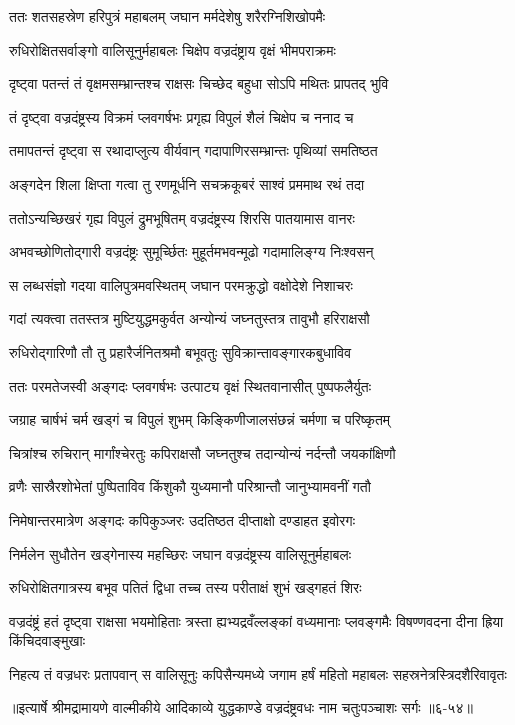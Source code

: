 \twolineshloka
{ततः शतसहस्रेण हरिपुत्रं महाबलम्}
{जघान मर्मदेशेषु शरैरग्निशिखोपमैः} %

\twolineshloka
{रुधिरोक्षितसर्वाङ्गो वालिसूनुर्महाबलः}
{चिक्षेप वज्रदंष्ट्राय वृक्षं भीमपराक्रमः} %

\twolineshloka
{दृष्ट्वा पतन्तं तं वृक्षमसम्भ्रान्तश्च राक्षसः}
{चिच्छेद बहुधा सोऽपि मथितः प्रापतद् भुवि} %

\twolineshloka
{तं दृष्ट्वा वज्रदंष्ट्रस्य विक्रमं प्लवगर्षभः}
{प्रगृह्य विपुलं शैलं चिक्षेप च ननाद च} %

\twolineshloka
{तमापतन्तं दृष्ट्वा स रथादाप्लुत्य वीर्यवान्}
{गदापाणिरसम्भ्रान्तः पृथिव्यां समतिष्ठत} %

\twolineshloka
{अङ्गदेन शिला क्षिप्ता गत्वा तु रणमूर्धनि}
{सचक्रकूबरं साश्वं प्रममाथ रथं तदा} %

\twolineshloka
{ततोऽन्यच्छिखरं गृह्य विपुलं द्रुमभूषितम्}
{वज्रदंष्ट्रस्य शिरसि पातयामास वानरः} %

\twolineshloka
{अभवच्छोणितोद्गारी वज्रदंष्ट्रः सुमूर्च्छितः}
{मुहूर्तमभवन्मूढो गदामालिङ्ग्य निःश्वसन्} %

\twolineshloka
{स लब्धसंज्ञो गदया वालिपुत्रमवस्थितम्}
{जघान परमक्रुद्धो वक्षोदेशे निशाचरः} %

\twolineshloka
{गदां त्यक्त्वा ततस्तत्र मुष्टियुद्धमकुर्वत}
{अन्योन्यं जघ्नतुस्तत्र तावुभौ हरिराक्षसौ} %

\twolineshloka
{रुधिरोद्गारिणौ तौ तु प्रहारैर्जनितश्रमौ}
{बभूवतुः सुविक्रान्तावङ्गारकबुधाविव} %

\twolineshloka
{ततः परमतेजस्वी अङ्गदः प्लवगर्षभः}
{उत्पाट्य वृक्षं स्थितवानासीत् पुष्पफलैर्युतः} %

\twolineshloka
{जग्राह चार्षभं चर्म खड्गं च विपुलं शुभम्}
{किङ्किणीजालसंछन्नं चर्मणा च परिष्कृतम्} %

\twolineshloka
{चित्रांश्च रुचिरान् मार्गांश्चेरतुः कपिराक्षसौ}
{जघ्नतुश्च तदान्योन्यं नर्दन्तौ जयकांक्षिणौ} %

\twolineshloka
{व्रणैः सास्रैरशोभेतां पुष्पिताविव किंशुकौ}
{युध्यमानौ परिश्रान्तौ जानुभ्यामवनीं गतौ} %

\twolineshloka
{निमेषान्तरमात्रेण अङ्गदः कपिकुञ्जरः}
{उदतिष्ठत दीप्ताक्षो दण्डाहत इवोरगः} %

\twolineshloka
{निर्मलेन सुधौतेन खड्गेनास्य महच्छिरः}
{जघान वज्रदंष्ट्रस्य वालिसूनुर्महाबलः} %

\twolineshloka
{रुधिरोक्षितगात्रस्य बभूव पतितं द्विधा}
{तच्च तस्य परीताक्षं शुभं खड्गहतं शिरः} %

\threelineshloka
{वज्रदंष्ट्रं हतं दृष्ट्वा राक्षसा भयमोहिताः}
{त्रस्ता ह्यभ्यद्रवँल्लङ्कां वध्यमानाः प्लवङ्गमैः}
{विषण्णवदना दीना ह्रिया किंचिदवाङ्मुखाः} %

\twolineshloka
{निहत्य तं वज्रधरः प्रतापवान् स वालिसूनुः कपिसैन्यमध्ये}
{जगाम हर्षं महितो महाबलः सहस्रनेत्रस्त्रिदशैरिवावृतः} %


॥इत्यार्षे श्रीमद्रामायणे वाल्मीकीये आदिकाव्ये युद्धकाण्डे वज्रदंष्ट्रवधः नाम चतुःपञ्चाशः सर्गः ॥६-५४॥
